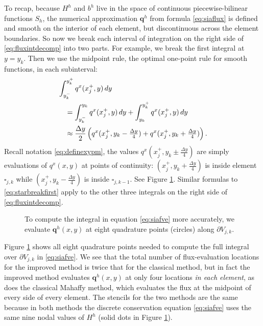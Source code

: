 \documentclass[twocolumn,letterpaper]{igs}
\newcommand\bq{\mathbf{q}}
\begin{document}
To recap, because $H^h$ and $b^h$ live in the space of continuous piecewise-bilinear functions $S_h$, the numerical approximation $\bq^h$ from formula \eqref{eq:siaflux} is defined and smooth on the interior of each element, but discontinuous across the element boundaries.  So now we break each interval of integration on the right side of \eqref{eq:fluxintdecomp} into two parts.  For example, we break the first integral at $y=y_k$.  Then we use the midpoint rule, the optimal one-point rule for smooth functions, in each subinterval:
\begin{align}
&\int_{y_k^-}^{y_k^+} q^x(x_j^+,y)\,dy  \label{eq:starbreakfirst} \\
  &\quad= \int_{y_k^-}^{y_k} q^x(x_j^+,y)\,dy + \int_{y_k}^{y_k^+} q^x(x_j^+,y)\,dy \notag \\
  &\quad\approx \frac{\Delta y}{2} \left(q^x(x_j^+,y_k-\tfrac{\Delta y}{4}) + q^x(x_j^+,y_k+\tfrac{\Delta y}{4})\right). \notag
\end{align}
Recall notation \eqref{eq:definexypm}, the values $q^x(x_j^+,y_k\pm\tfrac{\Delta y}{4})$ are simply evaluations of $q^x(x,y)$ at points of continuity: $(x_j^+,y_k+\tfrac{\Delta y}{4})$ is inside element $\square_{j,k}$ while $(x_j^+,y_k-\tfrac{\Delta y}{4})$ is inside $\square_{j,k-1}$.  See Figure \ref{fig:improvequadrature}.  Similar formulas to \eqref{eq:starbreakfirst} apply to the other three integrals on the right side of \eqref{eq:fluxintdecomp}.

\begin{figure}[ht]
\begin{center}

\end{center}
\caption{To compute the integral in equation \eqref{eq:siafve} more accurately, we evaluate $\bq^h(x,y)$ at eight quadrature points (circles) along $\partial V_{j,k}$.}
\label{fig:improvequadrature}
\end{figure}

Figure \ref{fig:improvequadrature} shows all eight quadrature points needed to compute the full integral over $\partial V_{j,k}$ in \eqref{eq:siafve}.  We see that the total number of flux-evaluation locations for the improved method is twice that for the classical method, but in fact the improved method evaluates $\bq^h(x,y)$ at only four locations \emph{in each element}, as does the classical Mahaffy method, which evaluates the flux at the midpoint of every side of every element.  The stencils for the two methods are the same because in both methods the discrete conservation equation \eqref{eq:siafve} uses the same nine nodal values of $H^h$ (solid dots in Figure \ref{fig:improvequadrature}).
\end{document}
